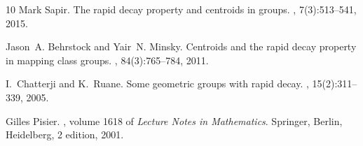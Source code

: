\documentclass[12pt,reqno]{amsart}
\numberwithin{equation}{section}
\begin{document}
\begin{thebibliography}{10}
Mark Sapir.
\newblock The rapid decay property and centroids in groups.
, 7(3):513--541, 2015.

Jason~A. Behrstock and Yair~N. Minsky.
\newblock Centroids and the rapid decay property in mapping class groups.
, 84(3):765--784, 2011.

I.~Chatterji and K.~Ruane.
\newblock Some geometric groups with rapid decay.
, 15(2):311--339, 2005.

Gilles Pisier.
, volume 1618 of
  {\em Lecture Notes in Mathematics}.
\newblock Springer, Berlin, Heidelberg, 2 edition, 2001.

\end{thebibliography}

%
%
%
%
\end{document}
